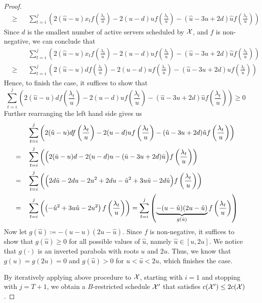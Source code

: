 \begin{proof}
\begin{align*}
	&\ge&&\sum\limits_{t=i}^j\left(2(\hat{u}-u)x_tf\left(\frac{\lambda_t}{u}\right)-2(u-d)uf\left(\frac{\lambda_t}{u}\right)-(\hat{u}-3u+2d)\hat{u}f\left(\frac{\lambda_t}{u}\right)\right)
\end{align*}
Since $d$ is the smallest number of active servers scheduled by $\mathcal{X}$, and $f$ is non-negative, we can conclude that
\begin{align*}
	&&&\sum\limits_{t=i}^j\left(2(\hat{u}-u)x_tf\left(\frac{\lambda_t}{u}\right)-2(u-d)uf\left(\frac{\lambda_t}{u}\right)-(\hat{u}-3u+2d)\hat{u}f\left(\frac{\lambda_t}{u}\right)\right)\\
	&\ge&&\sum\limits_{t=i}^j\left(2(\hat{u}-u)df\left(\frac{\lambda_t}{u}\right)-2(u-d)uf\left(\frac{\lambda_t}{u}\right)-(\hat{u}-3u+2d)\hat{u}f\left(\frac{\lambda_t}{u}\right)\right)
\end{align*}
Hence, to finish the case, it suffices to show that
\begin{equation*}
	\sum\limits_{t=i}^j\left(2(\hat{u}-u)df\left(\frac{\lambda_t}{u}\right)-2(u-d)uf\left(\frac{\lambda_t}{u}\right)-(\hat{u}-3u+2d)\hat{u}f\left(\frac{\lambda_t}{u}\right)\right)\ge 0
\end{equation*}
Further rearranging the left hand side gives us
\begin{align*}
	&&&\sum\limits_{t=i}^j\left(2(\hat{u}-u)df\left(\frac{\lambda_t}{u}\right)-2(u-d)uf\left(\frac{\lambda_t}{u}\right)-(\hat{u}-3u+2d)\hat{u}f\left(\frac{\lambda_t}{u}\right)\right)\\
	&=&&\sum\limits_{t=i}^j\left(\Bigl(2(\hat{u}-u)d-2(u-d)u-(\hat{u}-3u+2d)\hat{u}\Bigr)f\left(\frac{\lambda_t}{u}\right)\right)\\
	&=&&\sum\limits_{t=i}^j\left(\Bigl(2d\hat{u}-2du-2u^2+2du-\hat{u}^2+3u\hat{u}-2d\hat{u}\Bigr)f\left(\frac{\lambda_t}{u}\right)\right)\\
	&=&&\sum\limits_{t=i}^j\left(\left(-\hat{u}^2+3u\hat{u}-2u^2\right)f\left(\frac{\lambda_t}{u}\right)\right)=\sum\limits_{t=i}^j\left(\underbrace{-(u-\hat{u})(2u-\hat{u})}_{g(\hat{u})}f\left(\frac{\lambda_t}{u}\right)\right) 
\end{align*}
Now let $g(\hat{u})\coloneqq-(u-\hat{u})(2u-\hat{u})$. Since $f$ is non-negative, it suffices to show that $g(\hat{u})\ge0$ for all possible values of $\hat{u}$, namely $\hat{u}\in[u,2u]$. We notice that $g(\cdot)$ is an inverted parabola with roots $u$ and $2u$. Thus, we know that $g(u)=g(2u)=0$ and $g(\hat{u})>0$ for $u<\hat{u}<2u$, which finishes the case.

By iteratively applying above procedure to $\mathcal{X}$, starting with $i=1$ and stopping with $j=T+1$, we obtain a $B$-restricted schedule $\mathcal{X}'$ that satisfies $c(\mathcal{X}')\le2c(\mathcal{X})$.
\end{proof}

